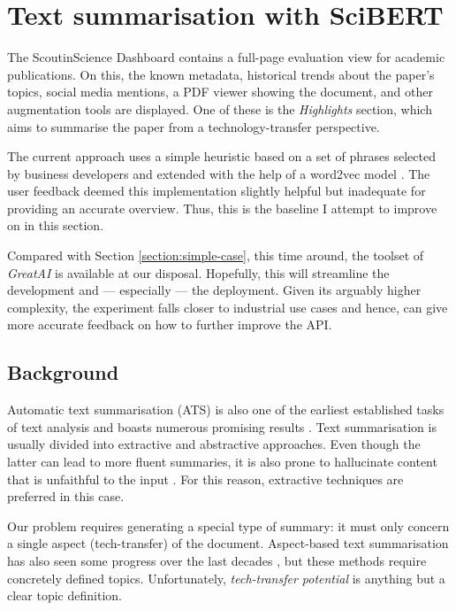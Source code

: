 \newpage
\section{Text summarisation with SciBERT} \label{section:complex-case}

The ScoutinScience Dashboard contains a full-page evaluation view for academic publications. On this, the known metadata, historical trends about the paper's topics, social media mentions, a PDF viewer showing the document, and other augmentation tools are displayed. One of these is the \textit{Highlights} section, which aims to summarise the paper from a technology-transfer perspective.

The current approach uses a simple heuristic based on a set of phrases selected by business developers and extended with the help of a word2vec model \cite{mikolov2013efficient}. The user feedback deemed this implementation slightly helpful but inadequate for providing an accurate overview. Thus, this is the baseline I attempt to improve on in this section.

\begin{displayquote}
Compared with Section \ref{section:simple-case}, this time around, the toolset of \textit{GreatAI} is available at our disposal. Hopefully, this will streamline the development and --- especially --- the deployment. Given its arguably higher complexity, the experiment falls closer to industrial use cases and hence, can give more accurate feedback on how to further improve the API.
\end{displayquote}

\subsection{Background}

Automatic text summarisation (ATS) is also one of the earliest established tasks of text analysis and boasts numerous promising results \cite{el2021automatic}. Text summarisation is usually divided into extractive and abstractive approaches. Even though the latter can lead to more fluent summaries, it is also prone to hallucinate content that is unfaithful to the input \cite{maynez2020faithfulness}. For this reason, extractive techniques are preferred in this case.

Our problem requires generating a special type of summary: it must only concern a single aspect (tech-transfer) of the document. Aspect-based text summarisation has also seen some progress over the last decades \cite{berkovsky2008aspect,hayashi2021wikiasp}, but these methods require concretely defined topics. Unfortunately, \textit{tech-transfer potential} is anything but a clear topic definition.

